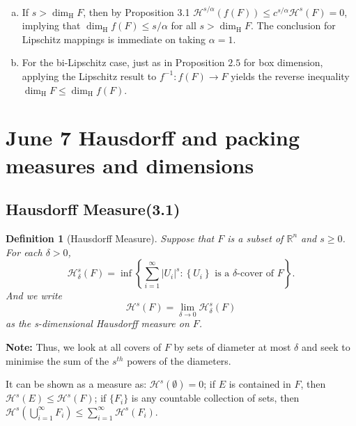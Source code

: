 \documentclass[12pt, a4paper]{article}
\newtheorem{definition}{Definition}[subsection]
\begin{document}
\begin{customsol}{} $ $
    \begin{enumerate}[(a)]
        \item If $s>\operatorname{dim}_{\mathrm{H}} F$, then by Proposition 3.1 $\mathcal{H}^{s / \alpha}(f(F)) \leq c^{s / \alpha} \mathcal{H}^{s}(F)=0$,
        implying that $\operatorname{dim}_{\mathrm{H}} f(F) \leq s / \alpha$ for all $s>\operatorname{dim}_{\mathrm{H}} F$. The conclusion for
        Lipschitz mappings is immediate on taking $\alpha=1$.
        \item For the bi-Lipschitz case, just as in Proposition $2.5$ for box dimension, applying the Lipschitz result to $f^{-1}: f(F) \rightarrow F$ yields the reverse inequality $\operatorname{dim}_{\mathrm{H}} F \leq \operatorname{dim}_{\mathrm{H}} f(F)$.
    \end{enumerate}
\end{customsol}

\newpage
\section{June 7 Hausdorff and packing measures and dimensions}
\subsection{Hausdorff Measure(3.1)}
\begin{definition}[Hausdorff Measure]
    Suppose that $F$ is a subset of $\mathbb{R}^n$ and $s\geq 0$. For each $\delta >0$,
    $$
    \mathcal{H}_{\delta}^{s}(F)=\inf \left\{\sum_{i=1}^{\infty}\left|U_{i}\right|^{s}:\left\{U_{i}\right\} \text { is a } \delta \text {-cover of } F\right\} .
    $$
    And we write
    $$
    \mathcal{H}^s (F) = \lim_{\delta\rightarrow 0} \mathcal{H}^s_\delta(F)
    $$
    as the s-dimensional Hausdorff measure on $F$.
\end{definition}

\textbf{Note:}
Thus, we look at all covers of $F$ by sets of diameter at most $\delta$ and seek to minimise the sum of the  $s^{th}$ powers of the diameters.

It can be shown as a measure as: $\mathcal{H}^s(\emptyset) = 0$; if $E$ is contained in $F$, then $\mathcal{H}^s(E)\leq \mathcal{H}^s(F)$; if $\{F_i\}$ is any countable collection of sets, then $\displaystyle \mathcal{H}^{s}\left(\bigcup_{i=1}^{\infty} F_{i}\right) \leq \sum_{i=1}^{\infty} \mathcal{H}^{s}\left(F_{i}\right)$.
\end{document}
